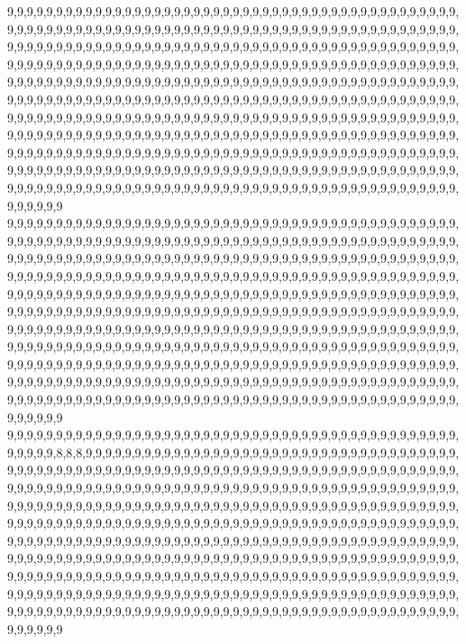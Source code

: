 9,9,9,9,9,9,9,9,9,9,9,9,9,9,9,9,9,9,9,9,9,9,9,9,9,9,9,9,9,9,9,9,9,9,9,9,9,9,9,9,9,9,9,9,9,9,9,9,9,9,9,9,9,9,9,9,9,9,9,9,9,9,9,9,9,9,9,9,9,9,9,9,9,9,9,9,9,9,9,9,9,9,9,9,9,9,9,9,9,9,9,9,9,9,9,9,9,9,9,9,9,9,9,9,9,9,9,9,9,9,9,9,9,9,9,9,9,9,9,9,9,9,9,9,9,9,9,9,9,9,9,9,9,9,9,9,9,9,9,9,9,9,9,9,9,9,9,9,9,9,9,9,9,9,9,9,9,9,9,9,9,9,9,9,9,9,9,9,9,9,9,9,9,9,9,9,9,9,9,9,9,9,9,9,9,9,9,9,9,9,9,9,9,9,9,9,9,9,9,9,9,9,9,9,9,9,9,9,9,9,9,9,9,9,9,9,9,9,9,9,9,9,9,9,9,9,9,9,9,9,9,9,9,9,9,9,9,9,9,9,9,9,9,9,9,9,9,9,9,9,9,9,9,9,9,9,9,9,9,9,9,9,9,9,9,9,9,9,9,9,9,9,9,9,9,9,9,9,9,9,9,9,9,9,9,9,9,9,9,9,9,9,9,9,9,9,9,9,9,9,9,9,9,9,9,9,9,9,9,9,9,9,9,9,9,9,9,9,9,9,9,9,9,9,9,9,9,9,9,9,9,9,9,9,9,9,9,9,9,9,9,9,9,9,9,9,9,9,9,9,9,9,9,9,9,9,9,9,9,9,9,9,9,9,9,9,9,9,9,9,9,9,9,9,9,9,9,9,9,9,9,9,9,9,9,9,9,9,9,9,9,9,9,9,9,9,9,9,9,9,9,9,9,9,9,9,9,9,9,9,9,9,9,9,9,9,9,9,9,9,9,9,9,9,9,9,9,9,9,9,9,9,9,9,9,9,9,9,9,9,9,9,9,9,9,9,9,9,9,9,9,9,9,9,9,9,9,9,9,9,9,9,9,9,9,9,9,9,9,9,9,9,9,9,9,9,9,9,9,9,9,9,9,9,9,9,9,9,9,9,9,9,9,9,9,9,9,9,9,9,9,9,9,9,9,9,9,9,9,9,9,9
9,9,9,9,9,9,9,9,9,9,9,9,9,9,9,9,9,9,9,9,9,9,9,9,9,9,9,9,9,9,9,9,9,9,9,9,9,9,9,9,9,9,9,9,9,9,9,9,9,9,9,9,9,9,9,9,9,9,9,9,9,9,9,9,9,9,9,9,9,9,9,9,9,9,9,9,9,9,9,9,9,9,9,9,9,9,9,9,9,9,9,9,9,9,9,9,9,9,9,9,9,9,9,9,9,9,9,9,9,9,9,9,9,9,9,9,9,9,9,9,9,9,9,9,9,9,9,9,9,9,9,9,9,9,9,9,9,9,9,9,9,9,9,9,9,9,9,9,9,9,9,9,9,9,9,9,9,9,9,9,9,9,9,9,9,9,9,9,9,9,9,9,9,9,9,9,9,9,9,9,9,9,9,9,9,9,9,9,9,9,9,9,9,9,9,9,9,9,9,9,9,9,9,9,9,9,9,9,9,9,9,9,9,9,9,9,9,9,9,9,9,9,9,9,9,9,9,9,9,9,9,9,9,9,9,9,9,9,9,9,9,9,9,9,9,9,9,9,9,9,9,9,9,9,9,9,9,9,9,9,9,9,9,9,9,9,9,9,9,9,9,9,9,9,9,9,9,9,9,9,9,9,9,9,9,9,9,9,9,9,9,9,9,9,9,9,9,9,9,9,9,9,9,9,9,9,9,9,9,9,9,9,9,9,9,9,9,9,9,9,9,9,9,9,9,9,9,9,9,9,9,9,9,9,9,9,9,9,9,9,9,9,9,9,9,9,9,9,9,9,9,9,9,9,9,9,9,9,9,9,9,9,9,9,9,9,9,9,9,9,9,9,9,9,9,9,9,9,9,9,9,9,9,9,9,9,9,9,9,9,9,9,9,9,9,9,9,9,9,9,9,9,9,9,9,9,9,9,9,9,9,9,9,9,9,9,9,9,9,9,9,9,9,9,9,9,9,9,9,9,9,9,9,9,9,9,9,9,9,9,9,9,9,9,9,9,9,9,9,9,9,9,9,9,9,9,9,9,9,9,9,9,9,9,9,9,9,9,9,9,9,9,9,9,9,9,9,9,9,9,9,9,9,9,9,9,9,9,9,9,9,9,9,9,9,9,9,9,9,9,9,9,9,9,9,9,9,9,9,9,9,9
9,9,9,9,9,9,9,9,9,9,9,9,9,9,9,9,9,9,9,9,9,9,9,9,9,9,9,9,9,9,9,9,9,9,9,9,9,9,9,9,9,9,9,9,9,9,9,9,9,9,9,8,8,8,9,9,9,9,9,9,9,9,9,9,9,9,9,9,9,9,9,9,9,9,9,9,9,9,9,9,9,9,9,9,9,9,9,9,9,9,9,9,9,9,9,9,9,9,9,9,9,9,9,9,9,9,9,9,9,9,9,9,9,9,9,9,9,9,9,9,9,9,9,9,9,9,9,9,9,9,9,9,9,9,9,9,9,9,9,9,9,9,9,9,9,9,9,9,9,9,9,9,9,9,9,9,9,9,9,9,9,9,9,9,9,9,9,9,9,9,9,9,9,9,9,9,9,9,9,9,9,9,9,9,9,9,9,9,9,9,9,9,9,9,9,9,9,9,9,9,9,9,9,9,9,9,9,9,9,9,9,9,9,9,9,9,9,9,9,9,9,9,9,9,9,9,9,9,9,9,9,9,9,9,9,9,9,9,9,9,9,9,9,9,9,9,9,9,9,9,9,9,9,9,9,9,9,9,9,9,9,9,9,9,9,9,9,9,9,9,9,9,9,9,9,9,9,9,9,9,9,9,9,9,9,9,9,9,9,9,9,9,9,9,9,9,9,9,9,9,9,9,9,9,9,9,9,9,9,9,9,9,9,9,9,9,9,9,9,9,9,9,9,9,9,9,9,9,9,9,9,9,9,9,9,9,9,9,9,9,9,9,9,9,9,9,9,9,9,9,9,9,9,9,9,9,9,9,9,9,9,9,9,9,9,9,9,9,9,9,9,9,9,9,9,9,9,9,9,9,9,9,9,9,9,9,9,9,9,9,9,9,9,9,9,9,9,9,9,9,9,9,9,9,9,9,9,9,9,9,9,9,9,9,9,9,9,9,9,9,9,9,9,9,9,9,9,9,9,9,9,9,9,9,9,9,9,9,9,9,9,9,9,9,9,9,9,9,9,9,9,9,9,9,9,9,9,9,9,9,9,9,9,9,9,9,9,9,9,9,9,9,9,9,9,9,9,9,9,9,9,9,9,9,9,9,9,9,9,9,9,9,9,9,9,9,9,9,9,9,9,9,9,9,9,9,9,9,9,9,9,9

